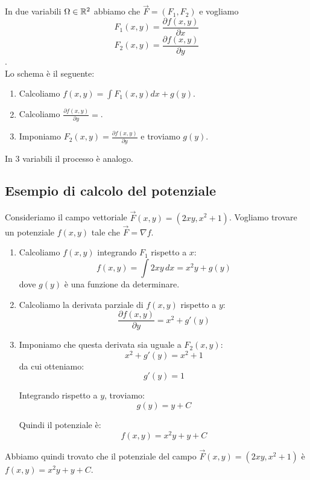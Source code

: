 In due variabili $\Omega \in \mathbb{R}^2$ abbiamo che $\vec F = (F_1, F_2)$ e vogliamo\\
$$F_1(x,y) = \frac{\partial f(x,y)}{\partial{x}} $$
$$F_2(x,y) = \frac{\partial f(x,y)}{\partial{y}} $$.\\
Lo schema è il seguente:
\begin{enumerate}
\item Calcoliamo $f(x,y) = \int F_1(x,y)dx + g(y)$.
\item Calcoliamo $\frac{\partial f(x,y)}{\partial{y}} =$.
\item Imponiamo $F_2(x,y)=\frac{\partial f(x,y)}{\partial{y}}$ e troviamo $g(y)$.
\end{enumerate}

In 3 variabili il processo è analogo.\\
\subsection{Esempio di calcolo del potenziale}

Consideriamo il campo vettoriale $\vec F(x,y) = (2xy, x^2 + 1)$. Vogliamo trovare un potenziale $f(x,y)$ tale che $\vec F = \nabla f$.

\begin{enumerate}
\item Calcoliamo $f(x,y)$ integrando $F_1$ rispetto a $x$:
$$ f(x,y) = \int 2xy \, dx = x^2 y + g(y) $$
dove $g(y)$ è una funzione da determinare.

\item Calcoliamo la derivata parziale di $f(x,y)$ rispetto a $y$:
$$ \frac{\partial f(x,y)}{\partial y} = x^2 + g'(y) $$

\item Imponiamo che questa derivata sia uguale a $F_2(x,y)$:
$$ x^2 + g'(y) = x^2 + 1 $$
da cui otteniamo:
$$ g'(y) = 1 $$

Integrando rispetto a $y$, troviamo:
$$ g(y) = y + C $$

Quindi il potenziale è:
$$ f(x,y) = x^2 y + y + C $$
\end{enumerate}

Abbiamo quindi trovato che il potenziale del campo $\vec F(x,y) = (2xy, x^2 + 1)$ è $f(x,y) = x^2 y + y + C$.\\




